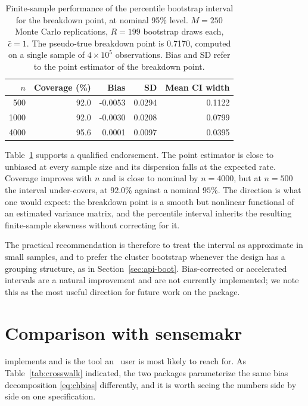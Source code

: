 \documentclass[article]{jss}\usepackage[]{graphicx}\usepackage[]{xcolor}
\newcommand{\Rlang}{\proglang{R}}
\begin{document}
\begin{table}[t!]
\centering
\begin{tabular}{rrrrr}
  \toprule
$n$ & Coverage (\%) & Bias & SD & Mean CI width \\ 
  \midrule
500 & 92.0 & -0.0053 & 0.0294 & 0.1122 \\ 
  1000 & 92.0 & -0.0030 & 0.0208 & 0.0799 \\ 
  4000 & 95.6 & 0.0001 & 0.0097 & 0.0395 \\ 
   \bottomrule
\end{tabular}
\caption{Finite-sample performance of the percentile bootstrap interval for the breakdown point, at nominal 95\% level. $M = 250$ Monte Carlo replications, $R = 199$ bootstrap draws each, $\bar c = 1$. The pseudo-true breakdown point is 0.7170, computed on a single sample of $4 \times 10^5$ observations. Bias and SD refer to the point estimator of the breakdown point.} 
\label{tab:coverage}
\end{table}


Table~\ref{tab:coverage} supports a qualified endorsement. The point
estimator is close to unbiased at every sample size and its dispersion
falls at the expected rate. Coverage improves with $n$ and is close to
nominal by $n = 4000$, but at $n = 500$ the interval under-covers, at
$92.0$\% against a nominal $95$\%. The
direction is what one would expect: the breakdown point is a smooth but
nonlinear functional of an estimated variance matrix, and the percentile
interval inherits the resulting finite-sample skewness without correcting
for it.

The practical recommendation is therefore to treat the interval as
approximate in small samples, and to prefer the cluster bootstrap whenever
the design has a grouping structure, as in Section~\ref{sec:api-boot}.
Bias-corrected or accelerated intervals are a natural improvement and are
not currently implemented; we note this as the most useful direction for
future work on the package.

\section{Comparison with sensemakr}\label{sec:compare}

 \citep{sensemakr} implements \citet{Cinelli2020} and is the
tool an \Rlang\ user is most likely to reach for. As
Table~\ref{tab:crosswalk} indicated, the two packages parameterize the same
bias decomposition \eqref{eq:chbias} differently, and it is worth seeing
the numbers side by side on one specification.
\end{document}
